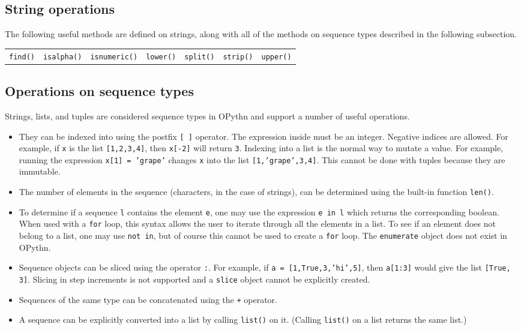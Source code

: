 \documentclass[11pt, twoside]{article}
\newcommand{\ms}{\texttt}
\begin{document}
    \subsection{String operations}
    The following useful methods are defined on strings, along with all of the methods on sequence types described in the following subsection.
    \begin{center}
        \begin{tabular}{ccccccc}
            \ms{find()} & \ms{isalpha()} & \ms{isnumeric()} & \ms{lower()} & \ms{split()} & \ms{strip()} & \ms{upper()}\\
    \end{tabular}
    \end{center}

    \subsection{Operations on sequence types}
    Strings, lists, and tuples are considered sequence types in OPythn and support a number of useful operations.
    \begin{itemize}
        \item They can be indexed into using the postfix \ms{[ ]} operator. The expression inside must be an integer. Negative indices are allowed. For example, if \ms{x} is the list \ms{[1,2,3,4]}, then \ms{x[-2]} will return \ms{3}. Indexing into a list is the normal way to mutate a value. For example, running the expression \ms{x[1] = 'grape'} changes \ms{x} into the list \ms{[1,'grape',3,4]}. This cannot be done with tuples because they are immutable.
        \item The number of elements in the sequence (characters, in the case of strings), can be determined using the built-in function \ms{len()}.
        \item To determine if a sequence \ms{l} contains the element \ms{e}, one may use the expression \ms{e in l} which returns the corresponding boolean. When used with a \ms{for} loop, this syntax allows the user to iterate through all the elements in a list. To see if an element does not belong to a list, one may use \ms{not in}, but of course this cannot be used to create a \ms{for} loop. The \ms{enumerate} object does not exist in OPythn.
        \item Sequence objects can be sliced using the operator \ms{:}. For example, if \ms{a = [1,True,3,'hi',5]}, then \ms{a[1:3]} would give the list \ms{[True, 3]}. Slicing in step increments is not supported and a \ms{slice} object cannot be explicitly created.
        \item Sequences of the same type can be concatenated using the \ms{+} operator.
        \item A sequence can be explicitly converted into a list by calling \ms{list()} on it. (Calling \ms{list()} on a list returns the same list.)
    \end{itemize}
\end{document}

